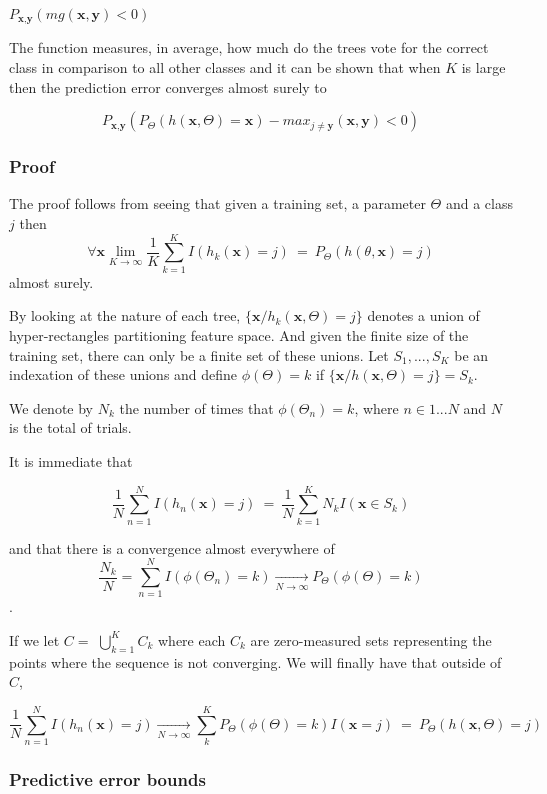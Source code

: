 $ P_{\textbf{x}, \textbf{y} }(mg(\textbf{x}, \textbf{y}) < 0) $


The function measures, in average, how much do the trees vote for the correct class in comparison to all other classes and it can be shown that when $K$ is large then the prediction error converges almost surely to

$$ P_{\textbf{x}, \textbf{y} } ( P_{\Theta} (h(\textbf{x}, \Theta) = \textbf{x}) - max_{j \neq \textbf{y}} (\textbf{x}, \textbf{y}) < 0) $$

\subsubsection{Proof}
The proof follows from seeing that given a training set, a parameter $\Theta$ and a class $j$ then
$$\forall \textbf{x} \lim_{K\to\infty} \frac{1}{K} \sum_{k=1}^K I(h_k(\textbf{x}) = j) \ =   \ P_\Theta(h(\theta,\textbf{x}) = j) $$
almost surely.

By looking at the nature of each tree, $\{\textbf{x} / h_k(\textbf{x}, \Theta) = j \}$ denotes a union of hyper-rectangles partitioning feature space. And given the finite size of the training set, there can only be a finite set of these unions. Let $S_1, ..., S_K$ be an indexation of these unions and define $\phi(\Theta) = k $ if $\{\textbf{x} / h(\textbf{x}, \Theta) = j \} = S_k$.

We denote by $N_k$ the number of times that $\phi(\Theta_n) =k $, where $n \in {1...N}$ and $N$ is the total of trials.

It is immediate that

$$ \frac{1}{N} \sum_{n=1}^N I(h_n(\textbf{x}) = j) \ = \  \frac{1}{N} \sum_{k=1}^K N_k I(\textbf{x} \in S_k)  $$

and that there is a convergence almost everywhere of $$ \frac{N_k}{N} = \sum_{n=1}^N  I(\phi(\Theta_n) = k)  \xrightarrow[N \to \infty]{}   P_{\Theta}(\phi(\Theta)= k)$$.

If we let $C = $ $\bigcup\limits_{k=1}^{K} C_{k}$ where each $C_k$ are zero-measured sets representing the points where the sequence is not converging. We will finally have that  outside of $C$,

$$ \frac{1}{N} \sum_{n=1}^N I(h_n(\textbf{x}) = j) \xrightarrow[N \to \infty]{} \sum_k^K    P_{\Theta}(\phi(\Theta)= k) I(\textbf{x} =j ) \ = \ P_{\Theta}(h(\textbf{x}, \Theta) = j)  $$



\subsubsection{Predictive error bounds}

